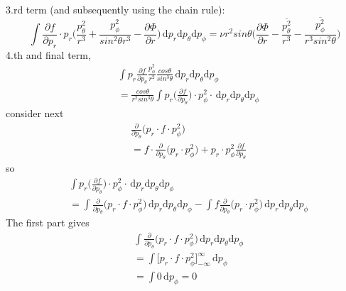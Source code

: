 3.rd term (and subsequently using the chain rule):
\begin{equation}
\int \! \frac{\partial f}{\partial p_r}\cdot p_r 
\bigg( \frac{p_{\theta}^2}{r^3} + \frac{p_{\phi}^2}{sin^2\theta r^3} - \frac{\partial \Phi}{\partial r} \bigg) \, \mathrm{d}p_r \mathrm{d}p_{\theta} \mathrm{d}p_{\phi} =
\nu r^2 sin \theta \Big( \frac{\partial \Phi}{\partial r} - \frac{\overline{p_{\theta}^2}}{r^3} - 
\frac{\overline{p_{\phi}^2}}{r^3 sin^2 \theta} \Big)
\end{equation}
4.th and final term,
\begin{equation}
\begin{aligned}
& \int \! p_r \frac{\partial f}{\partial p_{\theta}}\frac{p_{\phi}^2}{r^2}\frac{cos\theta}{sin^3\theta} \, \mathrm{d}p_r \mathrm{d}p_{\theta} \mathrm{d}p_{\phi} \\
& = \frac{cos\theta}{r^2sin^3\theta} \int \! p_r \Bigg( \frac{\partial f}{\partial p_{\theta}} \Bigg)\cdot p_{\phi}^2\cdot \, \mathrm{d}p_r \mathrm{d}p_{\theta} \mathrm{d}p_{\phi}
\end{aligned}
\end{equation}
consider next
\begin{equation}
\begin{aligned}
& \frac{\partial}{\partial p_{\theta}} \Bigg( p_r\cdot f \cdot p_{\phi}^2 \Bigg) \\
& = f\cdot \frac{\partial}{\partial p_{\theta}} \Bigg( p_r\cdot p_{\phi}^2 \Bigg) + p_r\cdot p_{\phi}^2\frac{\partial f}{\partial p_{\theta}}
\end{aligned}
\end{equation}
so
\begin{equation}
\begin{aligned}
& \int \! p_r \Bigg( \frac{\partial f}{\partial p_{\theta}} \Bigg)\cdot p_{\phi}^2\cdot \, \mathrm{d}p_r \mathrm{d}p_{\theta} \mathrm{d}p_{\phi} \\
& = \int \! \frac{\partial}{\partial p_{\theta}} \Bigg( p_r\cdot f \cdot p_{\phi}^2 \Bigg) \, \mathrm{d}p_r \mathrm{d}p_{\theta} \mathrm{d}p_{\phi}
- \int \! f\frac{\partial}{\partial p_{\theta}} \Bigg( p_r \cdot p_{\phi}^2 \Bigg) \, \mathrm{d}p_r \mathrm{d}p_{\theta} \mathrm{d}p_{\phi}
\end{aligned}
\end{equation}
The first part gives 
\begin{equation}
\begin{aligned}
& \int \! \frac{\partial}{\partial p_{\theta}} \Bigg( p_r\cdot f \cdot p_{\phi}^2 \Bigg) \, \mathrm{d}p_r \mathrm{d}p_{\theta} \mathrm{d}p_{\phi} \\
& = \int \! \Bigg[ p_r\cdot f \cdot p_{\phi}^2 \Bigg]_{-\infty}^{\infty} \, \mathrm{d}p_{\phi} \\
& = \int \! 0 \, \mathrm{d}p_{\phi} = 0
\end{aligned}
\end{equation}
